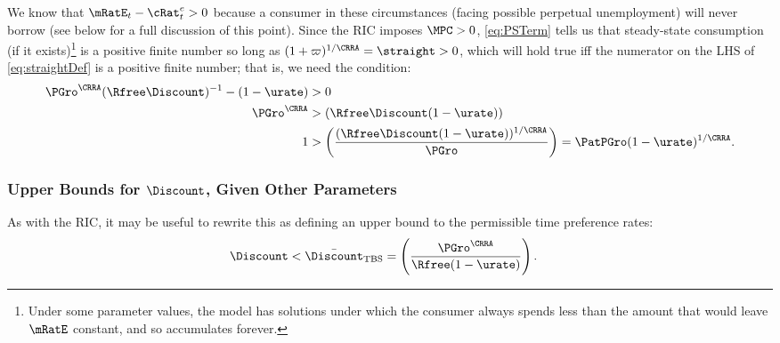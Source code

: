 \documentclass{handout}
\begin{document}
We know that $\mRatE_{t}-{\cRat}^{e}_{t} > 0$ because a consumer in these
circumstances (facing possible perpetual unemployment) will never
borrow (see below for a full discussion of this point). 
Since the RIC imposes $\MPCU>0$, \eqref{eq:PSTerm} tells
us that steady-state consumption (if it exists)\footnote{Under some parameter values, the model has solutions under which the consumer always spends less than the amount that would leave $\mRatE$ constant, and so accumulates forever.} is a positive finite number so long as $(1+\varpi)^{1/\CRRA}=\straight > 0$, which will hold true iff the numerator on the LHS of
\eqref{eq:straightDef} is a positive finite number; that is, we need the
condition:
\begin{equation}\begin{gathered}\begin{aligned}
        \PGro^{\CRRA}(\Rfree\Discount)^{-1}-(1-\urate) & >  0  \\
       \PGro^{\CRRA} & >  (\Rfree \Discount (1-\urate))
\\     1 & >  \left(\frac{(\Rfree \Discount (1-\urate))^{1/\CRRA}}{\PGro}\right) = \PatPGro (1-\urate)^{1/\CRRA} 
  \label{eq:GICExistsSoln} %
.\end{aligned}\end{gathered}\end{equation}

\hypertarget{GIFMax}{}\hypertarget{DiscountMaxGICTBS}{}

\subsubsection{Upper Bounds for $\Discount$, Given Other Parameters}


As with the RIC, it may be useful to rewrite this as defining an upper bound to the permissible time preference rates: \providecommand{\DiscountMaxGICTBS}{\bar{\Discount}_{\text{TBS}}}
\begin{equation}\begin{gathered}\begin{aligned}
\Discount < \DiscountMaxGICTBS & =  \left(\frac{\PGro^{\CRRA}}{\Rfree(1-\urate)}\right) \label{eq:DiscountMaxGICTBS}
.
\end{aligned}\end{gathered}\end{equation}
\end{document}
